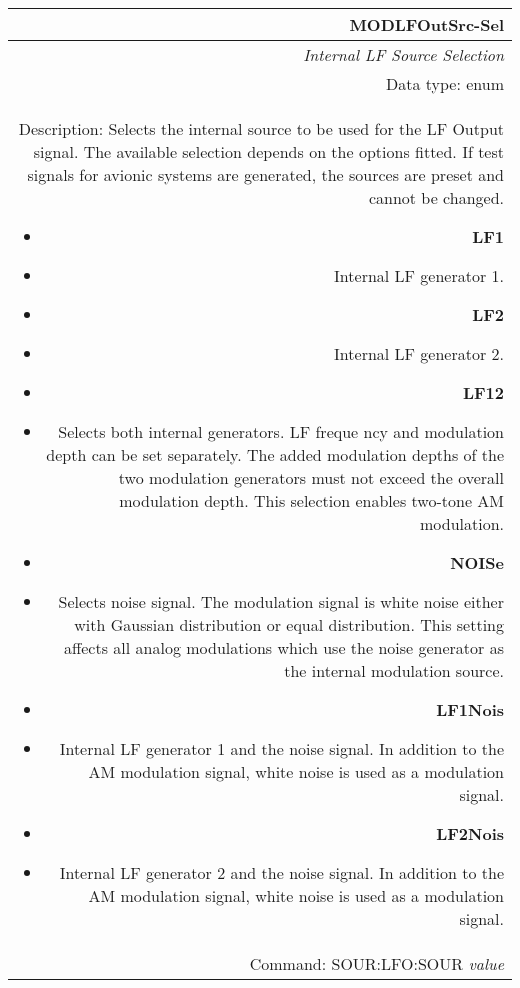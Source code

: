 \documentclass[openany]{article}
\begin{document}
		\begin{tabular}{N}
			\hline
			\bfseries MODLFOutSrc-Sel \\ \hline
			\emph{Internal LF Source Selection} \\
			Data type: enum \\  
			Description: Selects the internal source to be used for the LF Output signal. The available selection depends on the options fitted. If test signals for avionic systems are generated, the sources are preset and cannot be changed. \begin{itemize}[noitemsep]
				\small
                                \item[] \textbf{LF1}
                                \item[] Internal LF generator 1.
                                \item[] \textbf{LF2}
                                \item[] Internal LF generator 2.
                                \item[] \textbf{LF12}
                                \item[] Selects both internal generators. LF freque     ncy and modulation depth can be set separately. The added modulation depths of the two modulation generators must not exceed the overall modulation depth. This selection enables two-tone AM modulation.
                                \item[] \textbf{NOISe}
                                \item[] Selects noise signal. The modulation signal      is white noise either with Gaussian distribution or equal distribution. This setting affects all analog modulations which use the noise generator as the internal modulation source.
                                \item[] \textbf{LF1Nois}
                                \item[] Internal LF generator 1 and the noise signal. In addition to the AM modulation signal, white noise is used as a modulation signal.
                                \item[] \textbf{LF2Nois}
                                \item[] Internal LF generator 2 and the noise signal. In addition to the AM modulation signal, white noise is used as a modulation signal.
			\end{itemize} \\
			Command: SOUR:LFO:SOUR \emph{value} \\

		\end{tabular}
\end{document}
